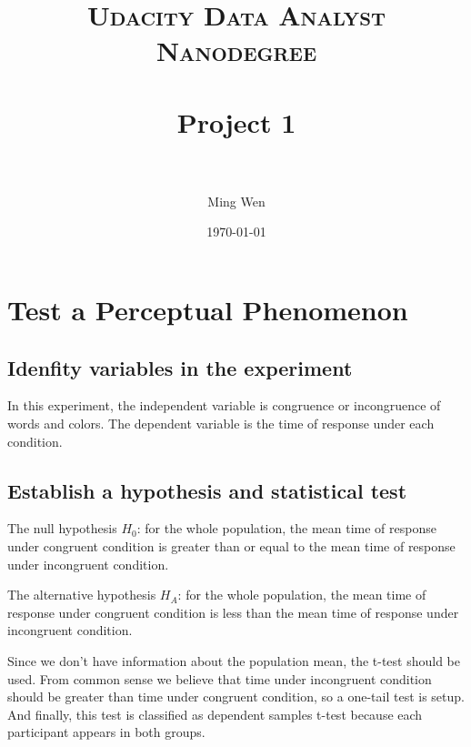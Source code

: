 \documentclass[paper=a4, fontsize=11pt]{scrartcl} %
\title{	
\normalfont \normalsize 
\textsc{Udacity Data Analyst Nanodegree} \\ [25pt] %
\horrule{0.5pt} \\[0.4cm] %
\LARGE{Project 1} \\ %
\horrule{0.5pt} \\[0.5cm] %
}
\author{Ming Wen} %
\date{\normalsize\today} %
\numberwithin{equation}{section} %
\numberwithin{figure}{section} %
\numberwithin{table}{section} %
\begin{document}
\maketitle %


\section{Test a Perceptual Phenomenon}

\subsection{Idenfity variables in the experiment}
\medskip
\noindent{}
\medskip

In this experiment, the independent variable is congruence or
incongruence of words and colors. The dependent variable is
the time of response under each condition.

\subsection{Establish a hypothesis and statistical test}
\medskip
\noindent{}
\medskip

The null hypothesis $H_0$: for the whole population,
the mean time of response under congruent
condition is greater than or equal to the mean time of response under
incongruent condition.

The alternative hypothesis $H_A$: for the whole population,
the mean time of response under congruent
condition is less than the mean time of response
under incongruent condition.

Since we don't have information about the population mean, the t-test
should be used. From common sense we believe that time under
incongruent condition should be greater than time under
congruent condition, so a one-tail test is setup.
And finally, this test is classified as dependent samples t-test
because each participant appears in both groups.
\end{document}

